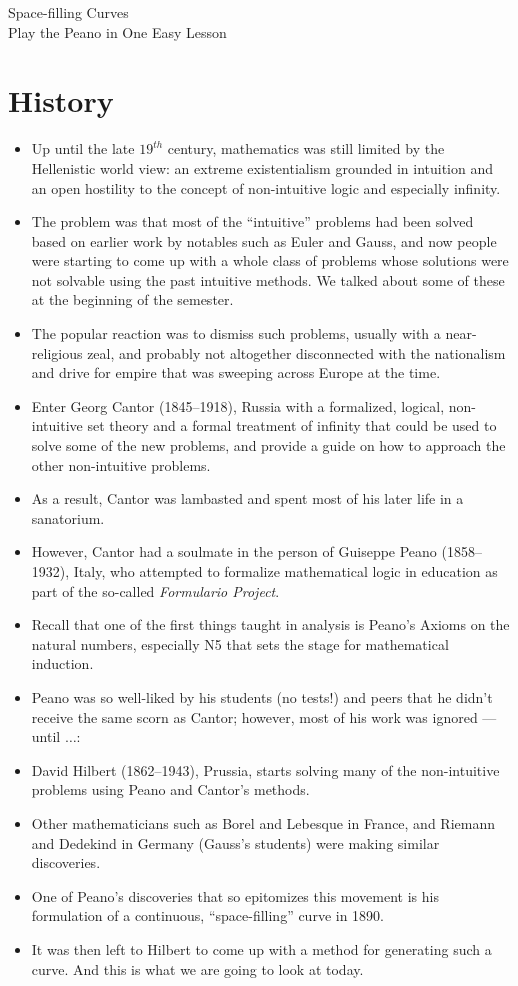 \documentclass[letterpaper,12pt,fleqn]{article}
\begin{document}
\begin{center}
\Large Space-filling Curves \\
\large Play the Peano in One Easy Lesson \\
\end{center}

\section*{History}

\begin{itemize}
\item Up until the late $19^{th}$ century, mathematics was still limited by the
Hellenistic world view: an extreme existentialism grounded in intuition and an
open hostility to the concept of non-intuitive logic and especially infinity.
\item The problem was that most of the ``intuitive'' problems had been solved
based on earlier work by notables such as Euler and Gauss, and now people were
starting to come up with a whole class of problems whose solutions were not
solvable using the past intuitive methods. We talked about some of these at
the beginning of the semester.
\item The popular reaction was to dismiss such problems, usually with a
near-religious zeal, and probably not altogether disconnected with the
nationalism and drive for empire that was sweeping across Europe at the time.
\item Enter Georg Cantor (1845--1918), Russia with a formalized, logical,
non-intuitive set theory and a formal treatment of infinity that could be used
to solve some of the new problems, and provide a guide on how to approach the
other non-intuitive problems.
\item As a result, Cantor was lambasted and spent most of his later life in a
sanatorium.
\item However, Cantor had a soulmate in the person of Guiseppe Peano
(1858--1932), Italy, who attempted to formalize mathematical logic in education
as part of the so-called \emph{Formulario Project}.
\item Recall that one of the first things taught in analysis is Peano's Axioms
on the natural numbers, especially N5 that sets the stage for mathematical
induction.
\item Peano was so well-liked by his students (no tests!) and peers that he
didn't receive the same scorn as Cantor; however, most of his work was
ignored --- until $\ldots$:
\item David Hilbert (1862--1943), Prussia, starts solving many of the
non-intuitive problems using Peano and Cantor's methods.
\item Other mathematicians such as Borel and Lebesque in France, and Riemann
and Dedekind in Germany (Gauss's students) were making similar discoveries.
\item One of Peano's discoveries that so epitomizes this movement is his
formulation of a continuous, ``space-filling'' curve in 1890.
\item It was then left to Hilbert to come up with a method for generating such
a curve. And this is what we are going to look at today.
\end{itemize}
\end{document}

